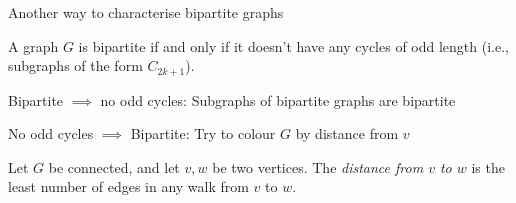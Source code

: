\documentclass{beamer}
\begin{document}
\begin{frame}{Another way to characterise bipartite graphs}  
  \begin{lemma}A graph $G$ is bipartite if and only if it doesn't have any cycles of odd length (i.e., subgraphs of the form $C_{2k+1}$).
    
    \end{lemma}
  \begin{block}{Bipartite $\implies$ no odd cycles:}
    Subgraphs of bipartite graphs are bipartite
  \end{block}
  \begin{block}{No odd cycles $\implies$ Bipartite:}
Try to colour $G$ by distance from $v$   
\end{block}
  \begin{definition}[Distance]Let $G$ be connected, and let $v,w$ be two vertices.  The \emph{distance from $v$ to $w$} is the least number of edges in any walk from $v$ to $w$.
    \end{definition}


  
\end{frame}




    
\end{document}
